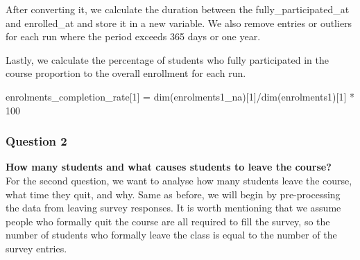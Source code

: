 \documentclass[12pt,]{article}
\newenvironment{Shaded}{\begin{snugshade}}{\end{snugshade}}
\newcommand{\DecValTok}[1]{\textcolor[rgb]{0.00,0.00,0.81}{#1}}
\newcommand{\FunctionTok}[1]{\textcolor[rgb]{0.00,0.00,0.00}{#1}}
\newcommand{\NormalTok}[1]{#1}
\newcommand{\OtherTok}[1]{\textcolor[rgb]{0.56,0.35,0.01}{#1}}
\newcommand{\SpecialCharTok}[1]{\textcolor[rgb]{0.00,0.00,0.00}{#1}}
\begin{document}
After converting it, we calculate the duration between the
fully\_participated\_at and enrolled\_at and store it in a new variable.
We also remove entries or outliers for each run where the period exceeds
365 days or one year.

\begin{Shaded}
\end{Shaded}

Lastly, we calculate the percentage of students who fully participated
in the course proportion to the overall enrollment for each run.

\begin{Shaded}
\begin{Highlighting}[]
\NormalTok{enrolments\_completion\_rate[}\DecValTok{1}\NormalTok{] }\OtherTok{=} 
  \FunctionTok{dim}\NormalTok{(enrolments1\_na)[}\DecValTok{1}\NormalTok{]}\SpecialCharTok{/}\FunctionTok{dim}\NormalTok{(enrolments1)[}\DecValTok{1}\NormalTok{] }\SpecialCharTok{*} \DecValTok{100}
\end{Highlighting}
\end{Shaded}

\hypertarget{question-2}{%
\subsubsection{Question 2}\label{question-2}}

\textbf{How many students and what causes students to leave the
course?}\\
\hfill\break For the second question, we want to analyse how many
students leave the course, what time they quit, and why. Same as before,
we will begin by pre-processing the data from leaving survey responses.
It is worth mentioning that we assume people who formally quit the
course are all required to fill the survey, so the number of students
who formally leave the class is equal to the number of the survey
entries.
\end{document}
